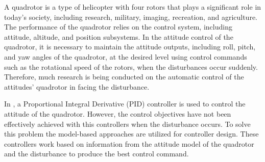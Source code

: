 \documentclass[conference]{IEEEtran}
\begin{document}
\noindent A quadrotor is a type of helicopter with four rotors that plays a significant role in today's society, including research, military, imaging, recreation, and agriculture. The performance of the quadrotor relies on the control system, including attitude, altitude, and position subsystems. In the attitude control of the quadrotor, it is necessary to maintain the attitude outputs, including roll, pitch, and yaw angles of the quadrotor, at the desired level using control commands such as the rotational speed of the rotors, when the disturbances occur suddenly. Therefore, much research is being conducted on the automatic control of the attitudes' quadrotor in facing the disturbance.


     In \cite{PID}, a Proportional Integral Derivative (PID) controller is used to control the attitude of the quadrotor. However, the control objectives have not been effectively achieved with this controllers when the disturbance occurs. To solve this problem the model-based approaches \cite{model_base} are utilized for controller design. These controllers work based on information from the attitude model of the quadrotor and the disturbance to produce the best control command.
\end{document}
